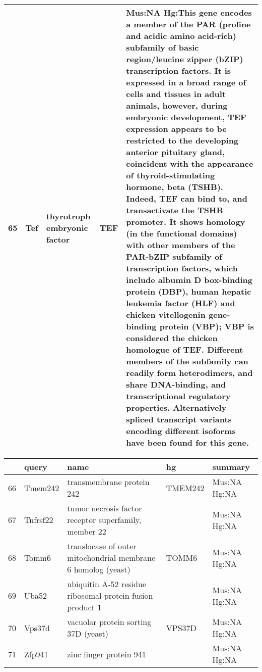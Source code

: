 \documentclass[11pt, landscape]{article}   	%
\begin{document}
\begin{table}[ht]
\begin{tabular}{rlp{3cm}lp{12cm}}
  65 & Tef & thyrotroph embryonic factor & TEF & Mus:NA Hg:This gene encodes a member of the PAR (proline and acidic amino acid-rich) subfamily of basic region/leucine zipper (bZIP) transcription factors. It is expressed in a broad range of cells and tissues in adult animals, however, during embryonic development, TEF expression appears to be restricted to the developing anterior pituitary gland, coincident with the appearance of thyroid-stimulating hormone, beta (TSHB). Indeed, TEF can bind to, and transactivate the TSHB promoter. It shows homology (in the functional domains) with other members of the PAR-bZIP subfamily of transcription factors, which include albumin D box-binding protein (DBP), human hepatic leukemia factor (HLF) and chicken vitellogenin gene-binding protein (VBP); VBP is considered the chicken homologue of TEF. Different members of the subfamily can readily form heterodimers, and share DNA-binding, and transcriptional regulatory properties. Alternatively spliced transcript variants encoding different isoforms have been found for this gene. \\ 
   \hline
\end{tabular}
\end{table}

\begin{table}[ht]
\centering
\tiny
\begin{tabular}{rlp{3cm}lp{12cm}}
  \hline
 & query & name & hg & summary \\ 
  \hline

  66 & Tmem242 & transmembrane protein 242 & TMEM242 & Mus:NA Hg:NA \\ 
  67 & Tnfrsf22 & tumor necrosis factor receptor superfamily, member 22 &  & Mus:NA Hg:NA \\ 
  68 & Tomm6 & translocase of outer mitochondrial membrane 6 homolog (yeast) & TOMM6 & Mus:NA Hg:NA \\ 
  69 & Uba52 & ubiquitin A-52 residue ribosomal protein fusion product 1 &  & Mus:NA Hg:NA \\ 
  70 & Vps37d & vacuolar protein sorting 37D (yeast) & VPS37D & Mus:NA Hg:NA \\ 
  71 & Zfp941 & zinc finger protein 941 &  & Mus:NA Hg:NA \\ 
   \hline
\end{tabular}
\end{table}
\end{document}
